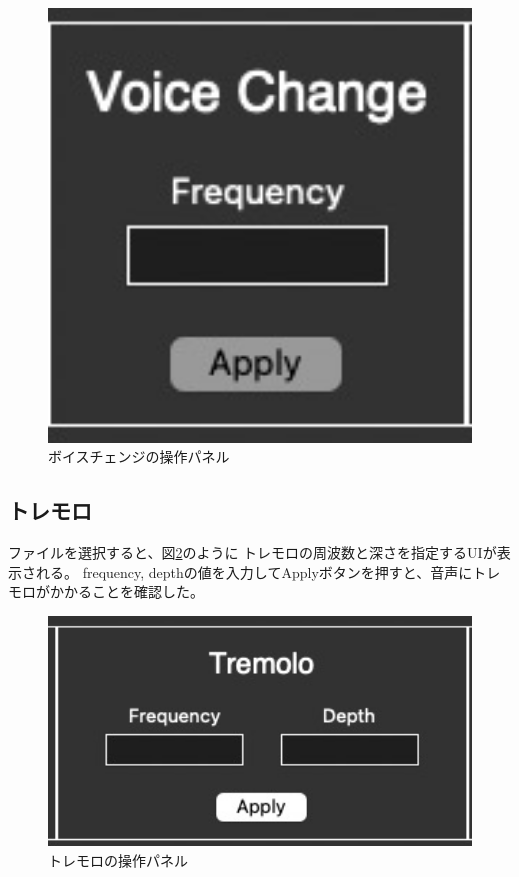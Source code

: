 \documentclass[a4paper,11pt]{jsarticle}
\begin{document}
\begin{figure}[h]
\centering
\includegraphics[keepaspectratio, width=13cm]
{./images/voice_change.jpg}
\caption{ボイスチェンジの操作パネル}
\label{fig:voice_change}
\end{figure}

\subsection{トレモロ}
ファイルを選択すると、図\ref{fig:tremolo}のように
トレモロの周波数と深さを指定するUIが表示される。
frequency, depthの値を入力してApplyボタンを押すと、音声にトレモロがかかることを確認した。

\begin{figure}[h]
\centering
\includegraphics[keepaspectratio, width=13cm]
{./images/tremolo.jpg}
\caption{トレモロの操作パネル}
\label{fig:tremolo}
\end{figure}
\end{document}
